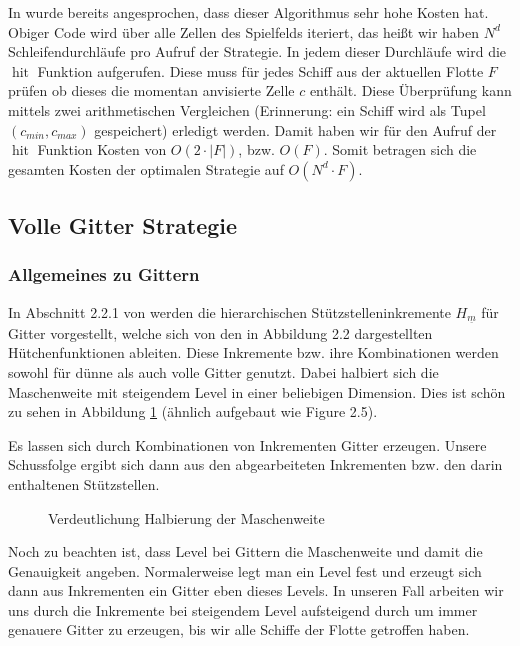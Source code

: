 \documentclass[a4paper,12pt]{llncs}
\numberwithin{equation}{section}
\DeclareMathOperator{\hit}{hit}
\begin{document}
In \cite{M13} wurde bereits angesprochen, dass dieser Algorithmus sehr hohe Kosten hat. Obiger Code wird über alle Zellen des Spielfelds iteriert, das heißt wir haben $N^d$ Schleifendurchläufe pro Aufruf der Strategie. In jedem dieser Durchläufe wird die $\hit$ Funktion aufgerufen. Diese muss für jedes Schiff aus der aktuellen Flotte $F$ prüfen ob dieses die momentan anvisierte Zelle $c$ enthält. Diese Überprüfung kann mittels zwei arithmetischen Vergleichen (Erinnerung: ein Schiff wird als Tupel $(c_{min},c_{max})$ gespeichert) erledigt werden. Damit haben wir für den Aufruf der $\hit$ Funktion Kosten von $O(2\cdot |F|)$, bzw. $O(F)$. Somit betragen sich die gesamten Kosten der optimalen Strategie auf $O(N^d\cdot F)$.
 

\subsection{Volle Gitter Strategie}

\subsubsection{Allgemeines zu Gittern}

In Abschnitt 2.2.1 von \cite{M13} werden die hierarchischen Stützstelleninkremente $H_{\underline{m}}$ für Gitter vorgestellt, welche sich von den in \cite{M13} Abbildung 2.2 dargestellten Hütchenfunktionen ableiten. Diese Inkremente bzw. ihre Kombinationen werden sowohl für dünne als auch volle Gitter genutzt. Dabei halbiert sich die Maschenweite mit steigendem Level in einer beliebigen Dimension. Dies ist schön zu sehen in Abbildung \ref{fig:gitter01} (ähnlich aufgebaut wie \cite{P10} Figure 2.5).

Es lassen sich durch Kombinationen von Inkrementen Gitter erzeugen. Unsere Schussfolge ergibt sich dann aus den abgearbeiteten Inkrementen bzw. den darin enthaltenen Stützstellen. 

\begin{figure}
	\centering
	\resizebox{90mm}{!}{}
	\caption{Verdeutlichung Halbierung der Maschenweite}
	\label{fig:gitter01}
\end{figure}


Noch zu beachten ist, dass Level bei Gittern die Maschenweite und damit die Genauigkeit angeben. Normalerweise legt man ein Level fest und erzeugt sich dann aus Inkrementen ein Gitter eben dieses Levels. In unseren Fall arbeiten wir uns durch die Inkremente bei steigendem Level aufsteigend durch um immer genauere Gitter zu erzeugen, bis wir alle Schiffe der Flotte getroffen haben.
\end{document}

